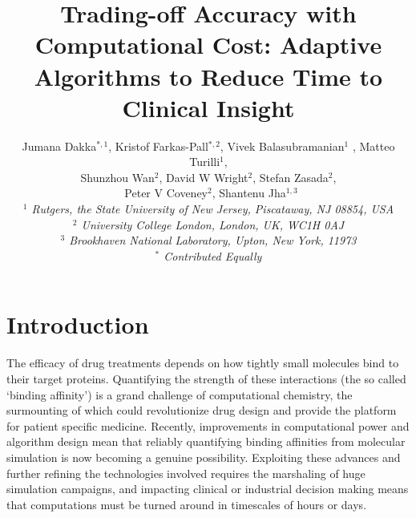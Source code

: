 \documentclass[conference]{IEEEtran}
\begin{document}


\title{Trading-off Accuracy with Computational Cost: Adaptive Algorithms to Reduce Time to Clinical Insight}




\author{Jumana Dakka$^{*,1}$, Kristof Farkas-Pall$^{*,2}$, Vivek Balasubramanian$^{1}$ , Matteo Turilli$^{1}$, \\ 
 Shunzhou Wan$^{2}$, David W Wright$^{2}$, Stefan Zasada$^{2}$, \\\
 Peter V Coveney$^{2}$, Shantenu Jha$^{1,3}$ \\

  \small{\emph{$^{1}$ Rutgers, the State University of New Jersey, Piscataway, NJ 08854, USA}}\\
   \small{\emph{$^{2}$ University College London, London, UK, WC1H 0AJ}}\\
   \small{\emph{$^{3}$ Brookhaven National Laboratory, Upton, New York, 11973}}\\
   \small{\emph{$^{*}$ Contributed Equally}}
}


\date{}
\maketitle

\begin{abstract} 

\end{abstract}


\section{Introduction}\label{sec:intro}

The efficacy of drug treatments depends on how tightly small molecules bind to their target proteins. Quantifying the strength of these interactions (the so called ‘binding affinity’) is a grand challenge of computational chemistry, the surmounting of which could revolutionize drug design and provide the platform for patient specific medicine. Recently, improvements in computational power and algorithm design mean that reliably quantifying binding affinities from molecular simulation is now becoming a genuine possibility. Exploiting these advances and further refining the technologies involved requires the marshaling of huge simulation campaigns, and impacting clinical or industrial decision making means that computations must be turned around in timescales of hours or days. 
\end{document}
